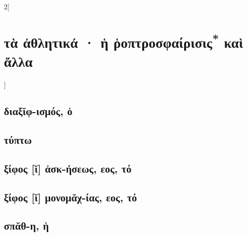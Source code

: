 \documentclass{book}
\begin{document}
\begin{multicols}{2}[\section{τὰ ἀθλητικά · ἡ ῥοπτροσφαίρισις\textsuperscript{*} καὶ ἄλλα}]
\subsection{διαξῐφ-ισμός, ὁ}
\subsection{τύπτω}
\subsection{ξίφος [ῐ] ἀσκ-ήσεως, εος, τό}
\subsection{ξίφος [ῐ] μονομᾰχ-ίας, εος, τό}
\subsection{σπᾰθ-η, ἡ}
~
\end{multicols}
\newpage  
\end{document}
